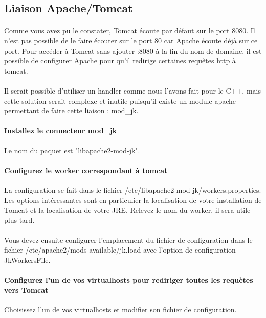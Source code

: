 \documentclass[12pt,a4paper]{article}
\begin{document}
\begin{itemize}
\section{Liaison Apache/Tomcat}

\paragraph{}
Comme vous avez pu le constater, Tomcat écoute par défaut sur le port 8080. Il n'est pas possible de le faire écouter sur le port 80 car Apache écoute déjà sur ce port. Pour accéder à Tomcat sans ajouter :8080 à la fin du nom de domaine, il est possible de configurer Apache pour qu'il redirige certaines requêtes http à tomcat.

\paragraph{}
Il serait possible d'utiliser un handler comme nous l'avons fait pour le C++, mais cette solution serait complexe et inutile puisqu'il existe un module apache permettant de faire cette liaison : mod\_jk.

\paragraph{Installez le connecteur mod\_jk\\}
Le nom du paquet est "libapache2-mod-jk". 

\paragraph{Configurez le worker correspondant à tomcat\\}
La configuration se fait dans le fichier /etc/libapache2-mod-jk/workers.properties. Les options intéressantes sont en particulier la localisation de votre installation de Tomcat et la localisation de votre JRE. Relevez le nom du worker, il sera utile plus tard.

\paragraph{}
Vous devez ensuite configurer l'emplacement du fichier de configuration dans le fichier /etc/apache2/mods-available/jk.load avec l'option de configuration JkWorkersFile.

\paragraph{Configurez l'un de vos virtualhosts pour rediriger toutes les requètes vers Tomcat\\}
Choisissez l'un de vos virtualhosts et modifier son fichier de configuration.


\end{itemize}
\end{document}
